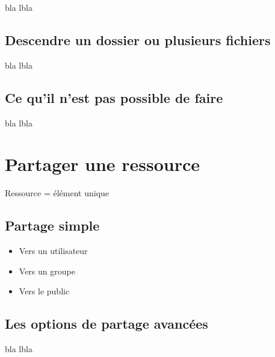bla lbla

\subsection{Descendre un dossier ou plusieurs fichiers}

bla lbla

\subsection{Ce qu'il n'est pas possible de faire}

bla lbla

\section{Partager une ressource}

Ressource = élément unique

\subsection{Partage simple}

\begin{itemize}
    \item Vers un utilisateur
    \item Vers un groupe
    \item Vers le public 
\end{itemize}

\subsection{Les options de partage avancées}

bla lbla